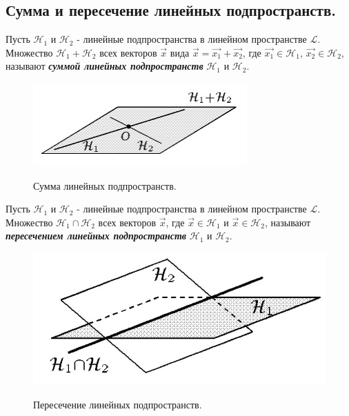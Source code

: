 \subsection{
    Сумма и пересечение линейных подпространств.
}   

\begin{definition}
    Пусть $\mathcal{H}_1$ и $\mathcal{H}_2$ - линейные подпространства в линейном пространстве $\mathcal{L}$. Множество $\mathcal{H}_1 + \mathcal{H}_2$ всех векторов $\vec{x}$ вида $\vec{x} = \vec{x_1} + \vec{x_2}$, где $\vec{x_1} \in \mathcal{H}_1$, $\vec{x_2} \in \mathcal{H}_2$, называют \textbf{\textit{суммой линейных подпространств}} $\mathcal{H}_1$ и $\mathcal{H}_2$. 
\end{definition}

\begin{figure}[H]
    \centering
    \includegraphics[scale=0.7]{images/module1/question04/1.jpg}
    \label{fig:picture_04_1}
    \caption{Сумма линейных подпространств.}
\end{figure}

\begin{definition}
    Пусть $\mathcal{H}_1$ и $\mathcal{H}_2$ - линейные подпространства в линейном пространстве $\mathcal{L}$. Множество $\mathcal{H}_1 \cap \mathcal{H}_2$ всех векторов $\vec{x}$, где $\vec{x} \in \mathcal{H}_1$ и $\vec{x} \in \mathcal{H}_2$, называют \textbf{\textit{пересечением линейных подпространств}} $\mathcal{H}_1$ и $\mathcal{H}_2$.
\end{definition}

\begin{figure}[H]
    \centering
    \includegraphics[scale=0.4]{images/module1/question04/2.jpg}
    \label{fig:picture_04_2}
    \caption{Пересечение линейных подпространств.}
\end{figure}

